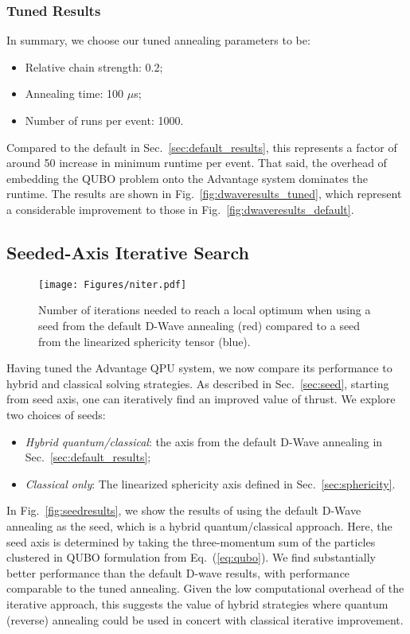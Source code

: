 \documentclass[aps,prd,twocolumn,superscriptaddress,preprintnumbers,nofootinbib,longbibliography,floatfix]{revtex4-1}
\DeclareRobustCommand{\Sec}[1]{Sec.~\ref{sec:#1}}
\DeclareRobustCommand{\Fig}[1]{Fig.~\ref{fig:#1}}
\DeclareRobustCommand{\Eq}[1]{Eq.~(\ref{eq:#1})}
\begin{document}
\subsubsection{Tuned Results}
\label{sec:tuned_results}

In summary, we choose our tuned annealing parameters to be:
%
\begin{itemize}
    \item Relative chain strength:  0.2;
    \item Annealing time: 100 $\mu$s;
    \item Number of runs per event:  1000.
\end{itemize}
%
Compared to the default in \Sec{default_results}, this represents a factor of around 50 increase in minimum runtime per event.
%
That said, the overhead of embedding the QUBO problem onto the Advantage system dominates the runtime.
%
The results are shown in \Fig{dwaveresults_tuned}, which represent a considerable improvement to those in \Fig{dwaveresults_default}.


\subsection{Seeded-Axis Iterative Search}
\label{sec:seed_results}

\begin{figure}
    \centering
    \texttt{[image: Figures/niter.pdf]}
    \caption{
    Number of iterations needed to reach a local optimum when using a seed from the default D-Wave annealing (red) compared to a seed from the linearized sphericity tensor (blue).}
    \label{fig:niter}
\end{figure}


Having tuned the Advantage QPU system, we now compare its performance to hybrid and classical solving strategies.
%
As described in \Sec{seed}, starting from seed axis, one can iteratively find an improved value of thrust.
%
We explore two choices of seeds:
%
\begin{itemize}
    \item \textit{Hybrid quantum/classical}:  the axis from the default D-Wave annealing in \Sec{default_results};
    \item \textit{Classical only}:  The linearized sphericity axis defined in \Sec{sphericity}.
\end{itemize}
%

In \Fig{seedresults}, we show the results of using the default D-Wave annealing as the seed, which is a hybrid quantum/classical approach.
%
Here, the seed axis is determined by taking the three-momentum sum of the particles clustered in QUBO formulation from \Eq{qubo}.
%
We find substantially better performance than the default D-wave results, with performance comparable to the tuned annealing.
%
Given the low computational overhead of the iterative approach, this suggests the value of hybrid strategies where quantum (reverse) annealing could be used in concert with classical iterative improvement.
\end{document}
